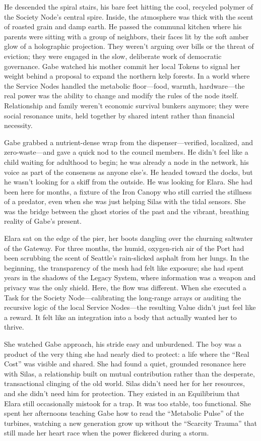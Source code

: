 He descended the spiral stairs, his bare feet hitting the cool, recycled polymer of the Society Node's central spire. Inside, the atmosphere was thick with the scent of roasted grain and damp earth. He passed the communal kitchen where his parents were sitting with a group of neighbors, their faces lit by the soft amber glow of a holographic projection. They weren't arguing over bills or the threat of eviction; they were engaged in the slow, deliberate work of democratic governance. Gabe watched his mother commit her local Tokens to signal her weight behind a proposal to expand the northern kelp forests. In a world where the Service Nodes handled the metabolic floor—food, warmth, hardware—the real power was the ability to change and modify the rules of the node itself. Relationship and family weren't economic survival bunkers anymore; they were social resonance units, held together by shared intent rather than financial necessity.

Gabe grabbed a nutrient-dense wrap from the dispenser—verified, localized, and zero-waste—and gave a quick nod to the council members. He didn't feel like a child waiting for adulthood to begin; he was already a node in the network, his voice as part of the consensus as anyone else's. He headed toward the docks, but he wasn't looking for a skiff from the outside. He was looking for Elara. She had been here for months, a fixture of the Iron Canopy who still carried the stillness of a predator, even when she was just helping Silas with the tidal sensors. She was the bridge between the ghost stories of the past and the vibrant, breathing reality of Gabe's present.

Elara sat on the edge of the pier, her boots dangling over the churning saltwater of the Gateway. For three months, the humid, oxygen-rich air of the Port had been scrubbing the scent of Seattle's rain-slicked asphalt from her lungs. In the beginning, the transparency of the mesh had felt like exposure; she had spent years in the shadows of the Legacy System, where information was a weapon and privacy was the only shield. Here, the flow was different. When she executed a Task for the Society Node—calibrating the long-range arrays or auditing the recursive logic of the local Service Nodes—the resulting Value didn't just feel like a reward. It felt like an integration into a body that actually wanted her to thrive.

She watched Gabe approach, his stride easy and unburdened. The boy was a product of the very thing she had nearly died to protect: a life where the ``Real Cost'' was visible and shared. She had found a quiet, grounded resonance here with Silas, a relationship built on mutual contribution rather than the desperate, transactional clinging of the old world. Silas didn't need her for her resources, and she didn't need him for protection. They existed in an Equilibrium that Elara still occasionally mistook for a trap. It was too stable, too functional. She spent her afternoons teaching Gabe how to read the ``Metabolic Pulse'' of the turbines, watching a new generation grow up without the ``Scarcity Trauma'' that still made her heart race when the power flickered during a storm.

